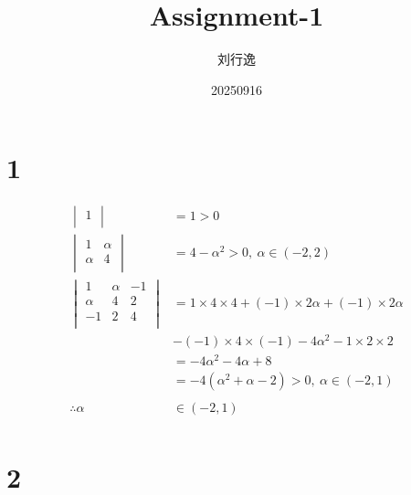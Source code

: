 \documentclass[a4paper,12pt]{article}
\title{Assignment-1}
\author{刘行逸}
\date{20250916}
\begin{document}
\maketitle

\section*{1}
\begin{align*}
    \begin{vmatrix}
        1 \\
    \end{vmatrix}         & = 1 > 0                                                          \\
    \begin{vmatrix}
        1      & \alpha \\
        \alpha & 4      \\
    \end{vmatrix}      & = 4 - \alpha^2 > 0, \ \alpha \in (-2, 2)                            \\
    \begin{vmatrix}
        1      & \alpha & -1 \\
        \alpha & 4      & 2  \\
        -1     & 2      & 4  \\
    \end{vmatrix} & = 1 \times 4 \times 4 + (-1) \times 2 \alpha + (-1) \times 2 \alpha      \\
                            & - (-1) \times 4 \times (-1) - 4 \alpha^2 - 1 \times 2 \times 2 \\
                            & = -4 \alpha^2 - 4 \alpha + 8                                   \\
                            & = -4 (\alpha^2 + \alpha -2) > 0, \ \alpha \in (-2, 1)          \\
    \\
    \therefore \alpha       & \in (-2, 1)                                                    \\
\end{align*}

\section*{2}
\end{document}
